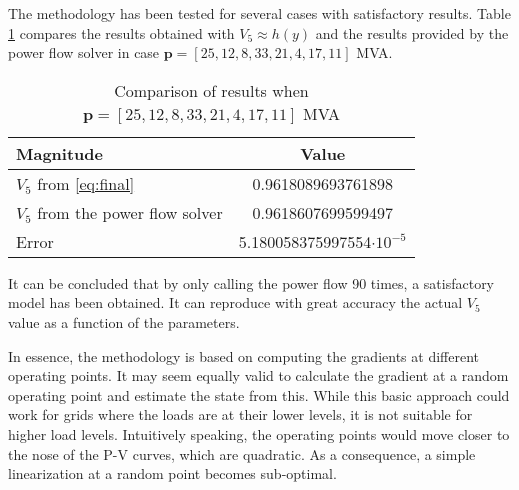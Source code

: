 The methodology has been tested for several cases with satisfactory results. Table \ref{tab:res} compares the results obtained with $V_5 \approx h(y)$ and the results provided by the power flow solver in case $\mathbf{p} = [25, 12, 8, 33, 21, 4, 17, 11]$ MVA. 

\begin{table}[!htb]\centering
  \begin{tabular}{lc}
  \hline
  Magnitude & Value \\
  \hline
  $V_5$ from \eqref{eq:final} & 0.9618089693761898\\
  $V_5$ from the power flow solver & 0.9618607699599497\\
  Error & 5.180058375997554$\cdot 10^{-5}$\\
  \hline
\end{tabular}
  \caption{Comparison of results when $\mathbf{p} = [25, 12, 8, 33, 21, 4, 17, 11]$ MVA}
  \label{tab:res}
\end{table}
It can be concluded that by only calling the power flow 90 times, a satisfactory model has been obtained. It can reproduce with great accuracy the actual $V_5$ value as a function of the parameters. 

In essence, the methodology is based on computing the gradients at different operating points. It may seem equally valid to calculate the gradient at a random operating point and estimate the state from this. While this basic approach could work for grids where the loads are at their lower levels, it is not suitable for higher load levels. Intuitively speaking, the operating points would move closer to the nose of the P-V curves, which are quadratic. As a consequence, a simple linearization at a random point becomes sub-optimal. 




